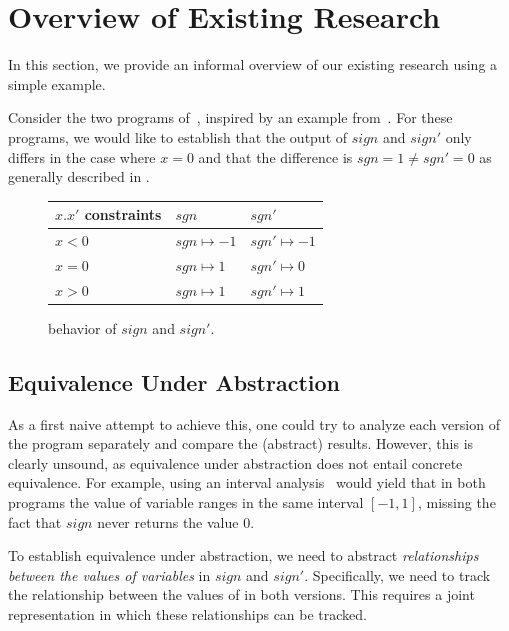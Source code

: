 \section{Overview of Existing Research}

In this section, we provide an informal overview of our existing research using a simple example.



Consider the two programs of~, inspired by an example from~\cite{MauborgneRival07}. For these programs, we would like to establish that the output of $sign$ and $sign'$ only differs in the case where $x=0$ and that the difference is $sgn = 1 \neq sgn' = 0$ as generally described in .

\begin{figure}[H]
\footnotesize
\centering
\begin{tabular}{l|l|l}
$x.x'$ constraints  & $sgn$             & $sgn'$
\\ \hline
$x < 0$             & $sgn \mapsto -1$  & $sgn' \mapsto -1$
\\ \hline
$x = 0$             & $sgn \mapsto 1$  & $sgn' \mapsto 0$
\\ \hline
$x > 0$             & $sgn \mapsto 1$  & $sgn' \mapsto 1$
\end{tabular}
\caption{behavior of $sign$ and $sign'$.}\label{Fi:SignSummary}
\end{figure}

\subsection{Equivalence Under Abstraction}
As a first naive attempt to achieve this, one could try to analyze each version of the program separately and compare the (abstract) results. However, this is clearly unsound, as equivalence under abstraction does not entail concrete equivalence. For example, using an interval analysis~\cite{CousotHalbwachs78} would yield that in both programs the value of variable  ranges in the same interval $[-1,1]$, missing the fact that $sign$ never returns the value $0$.

To establish equivalence under abstraction, we need to abstract \emph{relationships between the values of variables} in $sign$ and $sign'$. Specifically, we need to track the relationship between the values of  in both versions. This requires a joint representation in which these relationships can be tracked.

